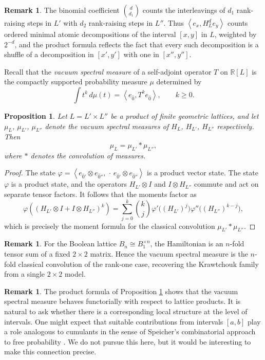 \documentclass[11pt]{amsart}
\newtheorem{prop}[thm]{Proposition}
\theoremstyle{definition}
\newtheorem{remark}[thm]{Remark}
\newcommand{\R}{\mathbb{R}}
\newcommand{\ip}[2]{\left\langle #1, #2 \right\rangle}
\newcommand{\zero}{\hat{0}}
\begin{document}
\begin{remark}
    The binomial coefficient $\binom{d}{d_1}$ counts the interleavings of $d_1$ rank-raising steps in $L'$ with $d_2$ rank-raising steps in $L''$. Thus $\ip{e_x}{H_L^d e_y}$ counts ordered minimal atomic decompositions of the interval $[x,y]$ in $L$, weighted by $2^{-d}$, and the product formula reflects the fact that every such decomposition is a shuffle of a decomposition in $[x',y']$ with one in $[x'',y'']$.
\end{remark}

Recall that the \emph{vacuum spectral measure} of a self-adjoint operator $T$ on $\R[L]$ is the compactly supported probability measure $\mu$ determined by
\[
\int t^k \, d\mu(t) = \ip{e_{\zero}}{T^k e_{\zero}}, \qquad k \ge 0.
\]

\begin{prop}\label{thm:conv}
Let $L = L' \times L''$ be a product of finite geometric lattices, and let $\mu_L$, $\mu_{L'}$, $\mu_{L''}$ denote the vacuum spectral measures of $H_L$, $H_{L'}$, $H_{L''}$ respectively.  Then
\[
\mu_L = \mu_{L'} \ast \mu_{L''},
\]
where $\ast$ denotes the convolution of measures.
\end{prop}

\begin{proof}
The state $\varphi = \ip{e_{\zero'} \otimes e_{\zero''}}{\,\cdot\, e_{\zero'} \otimes e_{\zero''}}$
is a product vector state.  The state $\varphi$ is a product state, and the operators $H_{L'} \otimes I$ and $I \otimes H_{L''}$ commute and act on separate tensor factors. It follows that the moments factor as
\[
\varphi\!\left((H_{L'} \otimes I + I \otimes H_{L''})^k\right)
=
\sum_{j=0}^k \binom{k}{j}
\varphi'\!\bigl((H_{L'})^{j}\bigr)
\varphi''\!\bigl((H_{L''})^{k-j}\bigr),
\]
which is precisely the moment formula for the classical convolution $\mu_{L'}\ast \mu_{L''}$.
\end{proof}

\begin{remark}
    For the Boolean lattice $B_n \cong B_1^{\times n}$, the Hamiltonian is an $n$-fold tensor sum of a fixed $2 \times 2$ matrix. Hence the vacuum spectral measure is the $n$-fold classical convolution of the rank-one case, recovering the Krawtchouk family from a single $2\times 2$ model.
\end{remark}

\begin{remark}
    The product formula of Proposition \ref{thm:conv} shows that the vacuum spectral measure behaves functorially with respect to lattice products. It is natural to ask whether there is a corresponding local structure at the level of intervals. One might expect that suitable contributions from intervals $[a,b]$ play a role analogous to cumulants in the sense of Speicher’s combinatorial approach to free probability \cite{Speicher}. We do not pursue this here, but it would be interesting to make this connection precise.
\end{remark}
\end{document}
